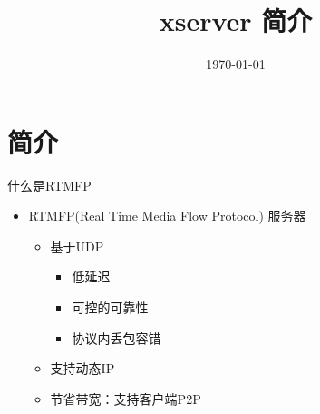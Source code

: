 \documentclass{beamer}
\title[]{xserver 简介}
\date[]{\today}
\begin{document}

\begin{frame}
  \titlepage
\end{frame}

\begin{frame}[<+->]
  \frametitle{}
  \tableofcontents
\end{frame}

\section{简介}

\begin{frame}[t]{什么是RTMFP}
    \begin{itemize}
        \item RTMFP(Real Time Media Flow Protocol) 服务器
            \begin{itemize}
                \item 基于UDP
                    \begin{itemize}
                        \item 低延迟
                        \item 可控的可靠性
                        \item 协议内丢包容错
                    \end{itemize}
                \item 支持动态IP
                \item 节省带宽：支持客户端P2P
            \end{itemize}
    \end{itemize}
\end{frame}
\end{document}

